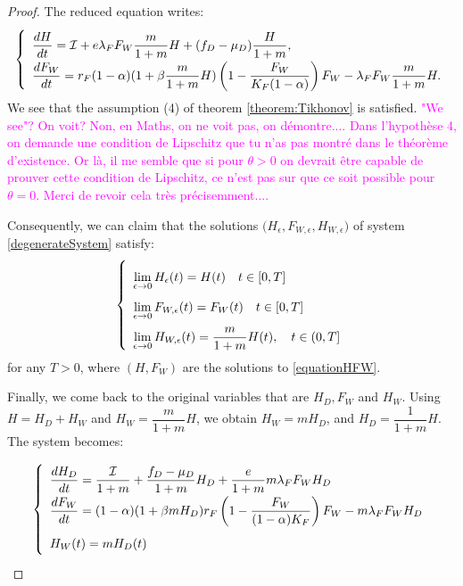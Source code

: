 \documentclass{article}
\newcommand{\lfw}{\lambda_{F}}
\newcommand{\lfw}{\lambda_{F}}
\newcommand{\cI}{\mathcal{I}}
\newcommand{\YD}[1]{\textcolor{magenta}{#1}}
\begin{document}
\begin{proof}
The reduced equation writes:
\begin{equation} \label{equationHFW}
\def\arraystretch{2}
\left\lbrace \begin{array}{l}
\dfrac{dH}{dt}= \cI + e\lfw F_W\dfrac{m}{1+m}H + (f_D - \mu_D)\dfrac{H}{1+m}, \\
\dfrac{dF_W}{dt} = r_F(1- \alpha) (1+ \beta \dfrac{m}{1+m}H ) \left(1 - \dfrac{F_W}{K_F(1-\alpha)} \right) F_W - \lfw F_W \dfrac{m}{1+m}H.  \\
\end{array} \right.
\end{equation}
We see that the assumption (4) of theorem \ref{theorem:Tikhonov} is satisfied. \YD{"We see"? On voit? Non, en Maths, on ne voit pas, on démontre.... Dans l'hypothèse 4, on demande une condition de Lipschitz que tu n'as pas montré dans le théorème d'existence. Or là, il me semble que si pour $\theta>0$ on devrait être capable de prouver cette condition de Lipschitz, ce n'est pas sur que ce soit possible pour $\theta=0$. Merci de revoir cela très précisemment.... }

Consequently, we can claim that the solutions 
$\Big(H_{ \epsilon}, F_{W,  \epsilon}, H_{W,  \epsilon} \Big)$  of system \eqref{degenerateSystem} satisfy:
\begin{equation*}
\def\arraystretch{2}
\left\lbrace \begin{array}{l}
\lim\limits_{ \epsilon \rightarrow 0}{H_{ \epsilon}(t)} = H(t) \quad t \in [0,T] \\
\lim\limits_{ \epsilon \rightarrow 0} F_{W,  \epsilon}(t) = F_W(t)\quad t \in [0,T] \\
 \lim\limits_{ \epsilon \rightarrow 0} H_{W,  \epsilon}(t) = \dfrac{m}{1+m}H(t), \quad  t\in (0,T] \\
\end{array} \right.
\end{equation*}
for any $T > 0$, where $(H, F_W)$ are the solutions to \eqref{equationHFW}. 

\medskip
Finally, we come back to the original variables that are $H_D, F_W$ and $H_W$. Using $H = H_D + H_W$ and $H_W = \dfrac{m}{1+m}H$, we obtain $H_W = m H_D$, and $H_D = \dfrac{1}{1+m}	H$. The system becomes:

\begin{equation*}
\def\arraystretch{2}
\left\lbrace \begin{array}{l}
\dfrac{dH_D}{dt} = \dfrac{\cI}{1+m} + \dfrac{f_D - \mu_D}{1+m} H_D + \dfrac{e}{1+m} m \lfw F_W H_D \\
\dfrac{dF_W}{dt} = (1-\alpha) (1+\beta m H_D) r_F \left(1 - \dfrac{F_W}{(1-\alpha)K_F} \right) F_W - m \lfw F_WH_D \\
H_W(t) = m H_D(t)
\end{array} \right.
\end{equation*}

\end{proof}
\end{document}
